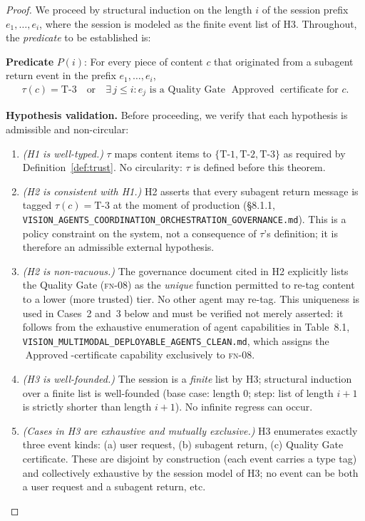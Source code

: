 \documentclass[12pt]{article}
\theoremstyle{definition}
\newcommand{\code}[1]{\texttt{#1}}
\newcommand{\FN}[1]{\textsc{fn-#1}}
\DeclareMathOperator{\Approved}{Approved}
\newcommand{\VisionClean}{\code{VISION\_MULTIMODAL\_\allowbreak DEPLOYABLE\_\allowbreak AGENTS\_CLEAN.md}}
\newcommand{\VisionGov}{\code{VISION\_AGENTS\_\allowbreak COORDINATION\_\allowbreak ORCHESTRATION\_\allowbreak GOVERNANCE.md}}
\begin{document}
\begin{proof}
We proceed by structural induction on the length $i$ of the session
prefix $e_1,\ldots,e_i$, where the session is modeled as the finite event
list of H3.  Throughout, the \emph{predicate} to be established is:

\medskip
\noindent\textbf{Predicate} $P(i)$: For every piece of content $c$ that
originated from a subagent return event in the prefix $e_1,\ldots,e_i$,
\begin{align}
    \label{eq:pred}
    \tau(c) = \mathrm{T\text{-}3}
    \quad\text{or}\quad
    \exists\, j \leq i : e_j \text{ is a Quality Gate }
    \Approved\text{ certificate for }c.
\end{align}

\medskip
\noindent\textbf{Hypothesis validation.}  Before proceeding, we verify
that each hypothesis is admissible and non-circular:
\begin{enumerate}
    \item[V.1] \emph{(H1 is well-typed.)} $\tau$ maps content items to
               $\{\mathrm{T\text{-}1},\mathrm{T\text{-}2},\mathrm{T\text{-}3}\}$
               as required by Definition~\ref{def:trust}.  No circularity:
               $\tau$ is defined before this theorem.
    \item[V.2] \emph{(H2 is consistent with H1.)} H2 asserts that every
               subagent return message is tagged $\tau(c)=\mathrm{T\text{-}3}$
               at the moment of production
               (\S8.1.1, \VisionGov{}).
               This is a policy constraint on the system, not a
               consequence of $\tau$'s definition; it is therefore an
               admissible external hypothesis.
    \item[V.3] \emph{(H2 is non-vacuous.)} The governance document cited
               in H2 explicitly lists the Quality Gate (\FN{08}) as the
               \emph{unique} function permitted to re-tag content to a
               lower (more trusted) tier.  No other agent may re-tag.
               This uniqueness is used in Cases~2 and~3 below and must be
               verified not merely asserted: it follows from the exhaustive
               enumeration of agent capabilities in Table~8.1,
               \VisionClean{},
               which assigns the $\Approved$-certificate capability
               exclusively to \FN{08}.
    \item[V.4] \emph{(H3 is well-founded.)} The session is a \emph{finite}
               list by H3; structural induction over a finite list is
               well-founded (base case: length 0; step: list of length
               $i+1$ is strictly shorter than length $i+1$).
               No infinite regress can occur.
    \item[V.5] \emph{(Cases in H3 are exhaustive and mutually exclusive.)}
               H3 enumerates exactly three event kinds:
               (a) user request, (b) subagent return, (c) Quality Gate
               certificate.  These are disjoint by construction (each event
               carries a type tag) and collectively exhaustive by the
               session model of H3; no event can be both a user request and
               a subagent return, etc.
\end{enumerate}


\end{proof}
\end{document}
